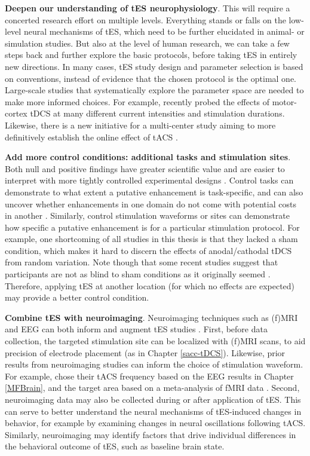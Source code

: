 \documentclass[11pt,]{memoir}
\begin{document}
\textbf{Deepen our understanding of tES neurophysiology}. This will require a concerted research effort on multiple levels. Everything stands or falls on the low-level neural mechanisms of tES, which need to be further elucidated in animal- or simulation studies. But also at the level of human research, we can take a few steps back and further explore the basic protocols, before taking tES in entirely new directions. In many cases, tES study design and parameter selection is based on conventions, instead of evidence that the chosen protocol is the optimal one. Large-scale studies that systematically explore the parameter space are needed to make more informed choices. For example, \textcite{Samani2019} recently probed the effects of motor-cortex tDCS at many different current intensities and stimulation durations. Likewise, there is a new initiative for a multi-center study aiming to more definitively establish the online effect of tACS \autocite{TACSchallenge}.

\textbf{Add more control conditions: additional tasks and stimulation sites}. Both null and positive findings have greater scientific value and are easier to interpret with more tightly controlled experimental designs \autocites{DeGraaf2018}{Parkin2015}{Polania2018}. Control tasks can demonstrate to what extent a putative enhancement is task-specific, and can also uncover whether enhancements in one domain do not come with potential costs in another \autocites{Brem2014a}{Iuculano2013}. Similarly, control stimulation waveforms or sites can demonstrate how specific a putative enhancement is for a particular stimulation protocol. For example, one shortcoming of all studies in this thesis is that they lacked a sham condition, which makes it hard to discern the effects of anodal/cathodal tDCS from random variation. Note though that some recent studies suggest that participants are not as blind to sham conditions as it originally seemed \autocites{Turi2019}{Greinacher2018}. Therefore, applying tES at another location (for which no effects are expected) may provide a better control condition.

\textbf{Combine tES with neuroimaging}. Neuroimaging techniques such as (f)MRI and EEG can both inform and augment tES studies \autocites{Bergmann2016}{Thut2017}. First, before data collection, the targeted stimulation site can be localized with (f)MRI scans, to aid precision of electrode placement (as in Chapter \ref{sacc-tDCS}). Likewise, prior results from neuroimaging studies can inform the choice of stimulation waveform. For example, \textcite{VanSchouwenburg2019} chose their tACS frequency based on the EEG results in Chapter \ref{MFBrain}, and the target area based on a meta-analysis of fMRI data \autocite{Langner2012}. Second, neuroimaging data may also be collected during or after application of tES. This can serve to better understand the neural mechanisms of tES-induced changes in behavior, for example by examining changes in neural oscillations following tACS. Similarly, neuroimaging may identify factors that drive individual differences in the behavioral outcome of tES, such as baseline brain state.
\end{document}
